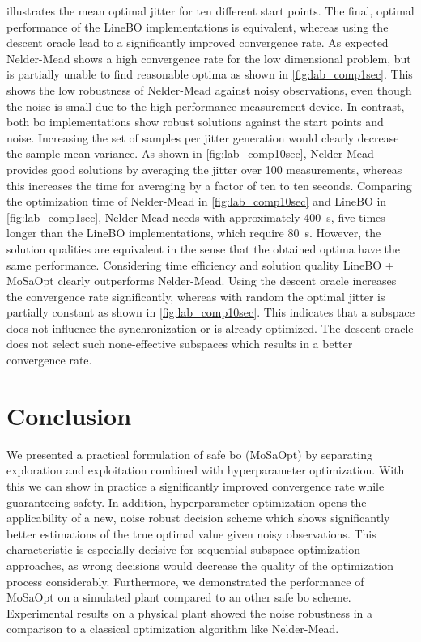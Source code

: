 \documentclass{ifacconf}
\newcounter{part}
\begin{document}
 illustrates the mean optimal jitter for ten different start points. The final, optimal performance of the LineBO implementations is equivalent, whereas using the descent oracle lead to a significantly improved convergence rate.  As expected Nelder-Mead shows a high convergence rate for the low dimensional problem, but is partially unable to find reasonable optima as shown in \cref{fig:lab_comp1sec}. This shows the low robustness of Nelder-Mead against noisy observations, even though the noise is small due to the high performance measurement device. In contrast, both \gls{bo} implementations show robust solutions against the start points and noise. Increasing the set of samples per jitter generation would clearly decrease the sample mean variance. As shown in \cref{fig:lab_comp10sec}, Nelder-Mead provides good solutions by averaging the jitter over 100 measurements, whereas this increases the time for averaging by a factor of ten to ten seconds. Comparing the optimization time of Nelder-Mead in \cref{fig:lab_comp10sec} and LineBO in \cref{fig:lab_comp1sec}, Nelder-Mead needs with approximately \SI{400}{\second}, five times longer than the LineBO implementations, which require \SI{80}{\second}. However, the solution qualities are equivalent in the sense that the obtained optima have the same performance. Considering time efficiency and solution quality LineBO + MoSaOpt clearly outperforms Nelder-Mead. Using the descent oracle increases the convergence rate significantly, whereas with random the optimal jitter is partially constant as shown in \cref{fig:lab_comp10sec}. This indicates that a subspace does not influence the synchronization or is already optimized. The descent oracle does not select such none-effective subspaces which results in a better convergence rate.  

\section{Conclusion} \label{sec:conclusion}
We presented a practical formulation of safe \acrlong{bo} (MoSaOpt) by separating exploration and exploitation combined with hyperparameter optimization. With this we can show in practice a significantly improved convergence rate while guaranteeing safety. In addition, hyperparameter optimization opens the applicability of a new, noise robust decision scheme which shows significantly better estimations of the true optimal value given noisy observations. This characteristic is especially decisive for sequential subspace optimization approaches, as wrong decisions would decrease the quality of the optimization process considerably. Furthermore, we demonstrated the performance of MoSaOpt on a simulated plant compared to an other safe \gls{bo} scheme. Experimental results on a physical plant showed the noise robustness in a comparison to a classical optimization algorithm like Nelder-Mead. 


\end{document}
